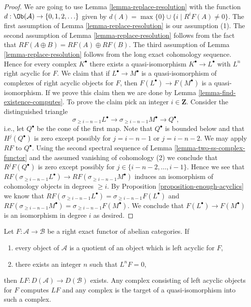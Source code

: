 \begin{proof}
\medskip\noindent
We are going to use Lemma \ref{lemma-replace-resolution} with the function
$d : \Ob(\mathcal{A}) \to \{0, 1, 2, \ldots \}$ given by
$d(A) = \max \{0\} \cup \{i \mid R^iF(A) \not = 0\}$.
The first assumption of Lemma \ref{lemma-replace-resolution}
is our assumption (1). The second assumption of
Lemma \ref{lemma-replace-resolution} follows from the fact
that $RF(A \oplus B) = RF(A) \oplus RF(B)$. The third assumption of
Lemma \ref{lemma-replace-resolution} follows from the long exact
cohomology sequence. Hence for every complex $K^\bullet$ there exists a
quasi-isomorphism $K^\bullet \to L^\bullet$ with $L^n$ right acyclic for $F$.
We claim that if $L^\bullet \to M^\bullet$ is a quasi-isomorphism of
complexes of right acyclic objects for $F$, then
$F(L^\bullet) \to F(M^\bullet)$
is a quasi-isomorphism. If we prove this claim then we are done by
Lemma \ref{lemma-find-existence-computes}.
To prove the claim pick an integer $i \in \mathbf{Z}$.
Consider the distinguished triangle
$$
\sigma_{\geq i - n - 1}L^\bullet \to
\sigma_{\geq i - n - 1}M^\bullet \to Q^\bullet,
$$
i.e., let $Q^\bullet$ be the cone of the first map.
Note that $Q^\bullet$ is bounded below and that
$H^j(Q^\bullet)$ is zero except possibly for $j = i - n - 1$
or $j = i - n - 2$. We may apply $RF$ to $Q^\bullet$.
Using the second spectral sequence of
Lemma \ref{lemma-two-ss-complex-functor}
and the assumed vanishing of cohomology (2) we conclude
that $R^jF(Q^\bullet)$ is zero except possibly for
$j \in \{i - n - 2, \ldots, i - 1\}$. Hence we see that
$RF(\sigma_{\geq i - n - 1}L^\bullet) \to RF(\sigma_{\geq i - n - 1}M^\bullet)$
induces an isomorphism of cohomology objects in degrees $\geq i$.
By Proposition \ref{proposition-enough-acyclics} we know that
$RF(\sigma_{\geq i - n - 1}L^\bullet) = \sigma_{\geq i - n - 1}F(L^\bullet)$
and
$RF(\sigma_{\geq i - n - 1}M^\bullet) = \sigma_{\geq i - n - 1}F(M^\bullet)$.
We conclude that $F(L^\bullet) \to F(M^\bullet)$
is an isomorphism in degree $i$ as desired.
\end{proof}

\begin{lemma}
\label{lemma-unbounded-left-derived}
Let $F : \mathcal{A} \to \mathcal{B}$ be a right exact functor of
abelian categories. If
\begin{enumerate}
\item every object of $\mathcal{A}$ is a quotient of an object
which is left acyclic for $F$,
\item there exists an integer $n$ such that $L^nF = 0$,
\end{enumerate}
then $LF : D(\mathcal{A}) \to D(\mathcal{B})$ exists. Any
complex consisting of left acyclic objects for $F$ computes
$LF$ and any complex is the target of a quasi-isomorphism
into such a complex.
\end{lemma}

